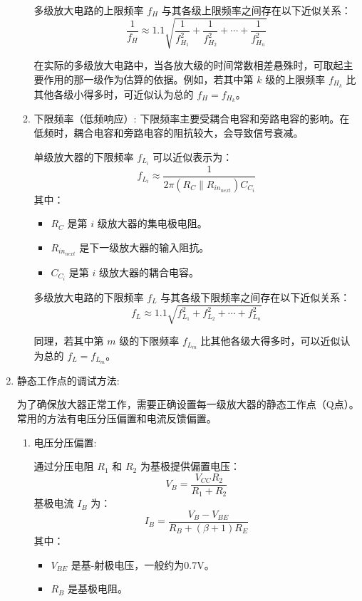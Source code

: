 \documentclass[dvipsnames, svgnames,a4paper,11pt]{article}
\begin{document}
\begin{enumerate}
\begin{enumerate}
					多级放大电路的上限频率 $f_H$ 与其各级上限频率之间存在以下近似关系：
					\[
					\frac{1}{f_H} \approx 1.1 \sqrt{\frac{1}{f_{H_1}^2} + \frac{1}{f_{H_2}^2} + \cdots + \frac{1}{f_{H_n}^2}}
					\]

					在实际的多级放大电路中，当各放大级的时间常数相差悬殊时，可取起主要作用的那一级作为估算的依据。例如，若其中第 $k$ 级的上限频率 $f_{H_k}$ 比其他各级小得多时，可近似认为总的 $f_H = f_{H_k}$。


					

				\item 下限频率（低频响应）:
					下限频率主要受耦合电容和旁路电容的影响。在低频时，耦合电容和旁路电容的阻抗较大，会导致信号衰减。

					单级放大器的下限频率 $f_{L_i}$ 可以近似表示为：
					\[
					f_{L_i} \approx \frac{1}{2 \pi (R_C \parallel R_{in_{next}}) C_{C_i}}
					\]
					其中：
					\begin{itemize}
						\item $R_C$ 是第 $i$ 级放大器的集电极电阻。
						\item $R_{in_{next}}$ 是下一级放大器的输入阻抗。
						\item $C_{C_i}$ 是第 $i$ 级放大器的耦合电容。
					\end{itemize}
					
					多级放大电路的下限频率 $f_L$ 与其各级下限频率之间存在以下近似关系：
					\[
					f_L \approx 1.1 \sqrt{f_{L_1}^2 + f_{L_2}^2 + \cdots + f_{L_n}^2}
					\]

					同理，若其中第 $m$ 级的下限频率 $f_{L_m}$ 比其他各级大得多时，可以近似认为总的 $f_L = f_{L_m}$。



					
			\end{enumerate}

		
		\item 静态工作点的调试方法:
			
			为了确保放大器正常工作，需要正确设置每一级放大器的静态工作点（Q点）。常用的方法有电压分压偏置和电流反馈偏置。

			\begin{enumerate}
				\item 电压分压偏置:
					
					通过分压电阻 $R_1$ 和 $R_2$ 为基极提供偏置电压：
					\[
					V_B = \frac{V_{CC} R_2}{R_1 + R_2}
					\]
					基极电流 $I_B$ 为：
					\[
					I_B = \frac{V_B - V_{BE}}{R_B + (\beta + 1) R_E}
					\]
					其中：
					\begin{itemize}
						\item $V_{BE}$ 是基-射极电压，一般约为0.7V。
						\item $R_B$ 是基极电阻。
					\end{itemize}


\end{enumerate}
\end{enumerate}
\end{document}
